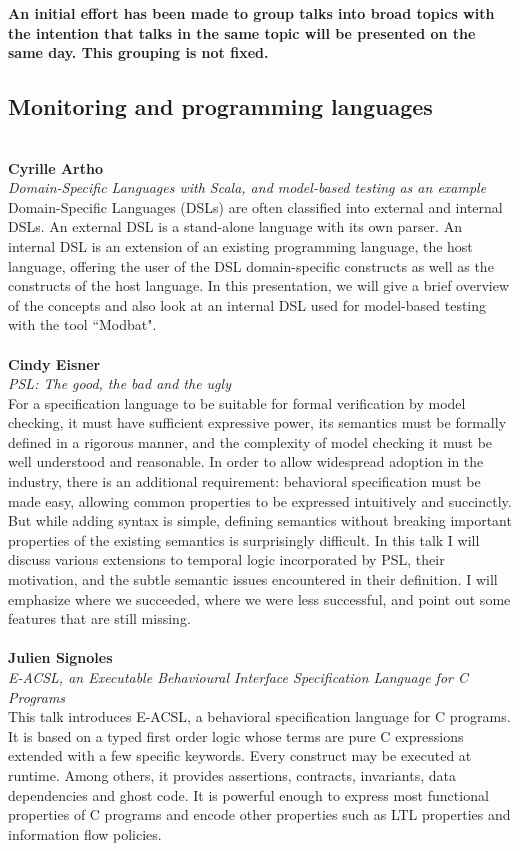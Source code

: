 \documentclass{article}
\newcounter{talkc}
\newcommand{\talk}[3]{\stepcounter{talkc}
\vspace{0.5em}~\\
\noindent
\textbf{#1}\\ 
\noindent\emph{#2}\\ 
\noindent#3\\
}
\begin{document}
\newpage

\vspace{1em}\noindent
\textbf{\color{red}An initial effort has been made to group talks into broad topics with the intention that talks in the same topic will be presented on the same day. This grouping is not fixed.}

\subsection*{Monitoring and programming languages}

\talk{Cyrille Artho}{Domain-Specific Languages with Scala, and model-based testing as an example}
{Domain-Specific Languages (DSLs) are often classified into external and internal DSLs. An external DSL is a stand-alone language with its own parser. An internal DSL is an extension of an existing programming language, the host language, offering the user of the DSL domain-specific constructs as well as the constructs of the host language. In this presentation, we will give a brief overview of the concepts and also look at an internal DSL used for model-based testing with the tool ``Modbat".}
%
\talk{Cindy Eisner}{PSL: The good, the bad and the ugly}{For a specification language to be suitable for formal verification by model checking, it must have sufficient expressive power, its semantics must be formally defined in a rigorous manner, and the complexity of model checking it must be well understood and reasonable. In order to allow widespread adoption in the industry, there is an additional requirement: behavioral specification must be made easy, allowing common properties to be expressed intuitively and succinctly. But while adding syntax is simple, defining semantics without breaking important properties of the existing semantics is surprisingly difficult. In this talk I will discuss various extensions to temporal logic incorporated by PSL, their motivation, and the subtle semantic issues encountered in their definition. I will emphasize where we succeeded, where we were less successful, and point out some features that are still missing.}
%
\talk{Julien Signoles}{E-ACSL, an Executable Behavioural Interface Specification Language for C Programs}{This talk introduces E-ACSL, a behavioral specification language for C programs. It is based on a typed first order logic whose terms are pure C expressions extended with a few specific keywords. Every construct may be executed at runtime. Among others, it provides assertions, contracts, invariants, data dependencies and ghost code. It is powerful enough to express most functional properties of C programs and encode other properties such as LTL properties and information flow policies.}
\end{document}
